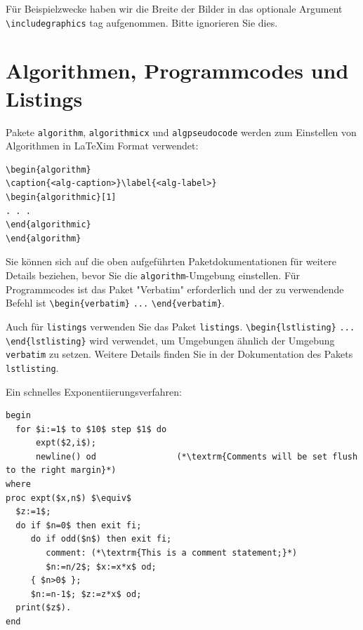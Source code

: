\documentclass[pdflatex,sn-mathphys-num]{sn-jnl}%
\theoremstyle{thmstyleone}%
\theoremstyle{thmstyletwo}%
\theoremstyle{thmstylethree}%
\begin{document}
Für Beispielzwecke haben wir die Breite der Bilder in das optionale Argument \verb+\includegraphics+ tag aufgenommen. Bitte ignorieren Sie dies. 

\section{Algorithmen, Programmcodes und Listings}\label{sec7}

Pakete \verb+algorithm+, \verb+algorithmicx+ und \verb+algpseudocode+ werden zum Einstellen von Algorithmen in \LaTeX im Format verwendet:

\bigskip\begin{verbatim}
\begin{algorithm}
\caption{<alg-caption>}\label{<alg-label>}
\begin{algorithmic}[1]
. . .
\end{algorithmic}
\end{algorithm}
\end{verbatim}
\bigskip%

Sie können sich auf die oben aufgeführten Paketdokumentationen für weitere Details beziehen, bevor Sie die \verb+algorithm+-Umgebung einstellen. Für Programmcodes ist das Paket "Verbatim" erforderlich und der zu verwendende Befehl ist \verb+\begin{verbatim}+ \verb+...+ \verb+\end{verbatim}+.

Auch für \verb+listings+ verwenden Sie das Paket \verb+listings+. \verb+\begin{lstlisting}+ \verb+...+ \verb+\end{lstlisting}+ wird verwendet, um Umgebungen ähnlich der Umgebung \verb+verbatim+ zu setzen. Weitere Details finden Sie in der Dokumentation des Pakets \verb+lstlisting+.

Ein schnelles Exponentiierungsverfahren:

\begin{lstlisting}
begin
  for $i:=1$ to $10$ step $1$ do
      expt($2,i$);  
      newline() od                (*\textrm{Comments will be set flush to the right margin}*)
where
proc expt($x,n$) $\equiv$
  $z:=1$;
  do if $n=0$ then exit fi;
     do if odd($n$) then exit fi;                 
        comment: (*\textrm{This is a comment statement;}*)
        $n:=n/2$; $x:=x*x$ od;
     { $n>0$ };
     $n:=n-1$; $z:=z*x$ od;
  print($z$). 
end
\end{lstlisting}
\end{document}
